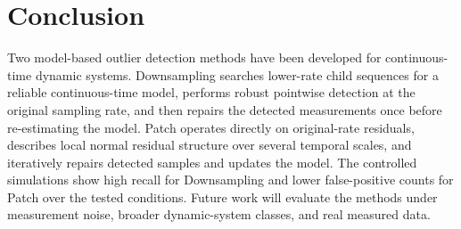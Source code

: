 \documentclass[journal]{IEEEtran}
\begin{document}
\section{Conclusion}
Two model-based outlier detection methods have been developed for continuous-time dynamic systems. Downsampling searches lower-rate child sequences for a reliable continuous-time model, performs robust pointwise detection at the original sampling rate, and then repairs the detected measurements once before re-estimating the model. Patch operates directly on original-rate residuals, describes local normal residual structure over several temporal scales, and iteratively repairs detected samples and updates the model. The controlled simulations show high recall for Downsampling and lower false-positive counts for Patch over the tested conditions. Future work will evaluate the methods under measurement noise, broader dynamic-system classes, and real measured data.
\end{document}
